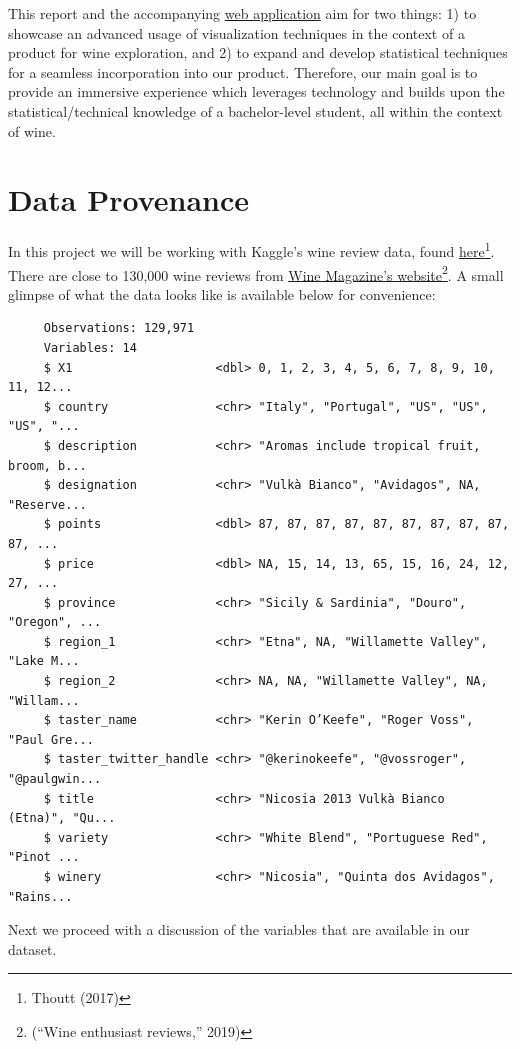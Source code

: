 \documentclass[12pt,twoside]{amherstthesis}
\begin{document}
This report and the accompanying
\href{https://szablah.shinyapps.io/wine/}{web application} aim for two
things: 1) to showcase an advanced usage of visualization techniques in
the context of a product for wine exploration, and 2) to expand and
develop statistical techniques for a seamless incorporation into our
product. Therefore, our main goal is to provide an immersive experience
which leverages technology and builds upon the statistical/technical
knowledge of a bachelor-level student, all within the context of wine.

\section{Data Provenance}\label{data-provenance}

In this project we will be working with Kaggle's wine review data, found
\href{https://www.kaggle.com/zynicide/wine-reviews}{here}\footnote{Thoutt
  (2017)}. There are close to 130,000 wine reviews from
\href{https://www.winemag.com/?s=\&drink_type=wine\&page=0}{Wine
Magazine's website}\footnote{(``Wine enthusiast reviews,'' 2019)}. A
small glimpse of what the data looks like is available below for
convenience:
\begin{verbatim}
     Observations: 129,971
     Variables: 14
     $ X1                    <dbl> 0, 1, 2, 3, 4, 5, 6, 7, 8, 9, 10, 11, 12...
     $ country               <chr> "Italy", "Portugal", "US", "US", "US", "...
     $ description           <chr> "Aromas include tropical fruit, broom, b...
     $ designation           <chr> "Vulkà Bianco", "Avidagos", NA, "Reserve...
     $ points                <dbl> 87, 87, 87, 87, 87, 87, 87, 87, 87, 87, ...
     $ price                 <dbl> NA, 15, 14, 13, 65, 15, 16, 24, 12, 27, ...
     $ province              <chr> "Sicily & Sardinia", "Douro", "Oregon", ...
     $ region_1              <chr> "Etna", NA, "Willamette Valley", "Lake M...
     $ region_2              <chr> NA, NA, "Willamette Valley", NA, "Willam...
     $ taster_name           <chr> "Kerin O’Keefe", "Roger Voss", "Paul Gre...
     $ taster_twitter_handle <chr> "@kerinokeefe", "@vossroger", "@paulgwin...
     $ title                 <chr> "Nicosia 2013 Vulkà Bianco  (Etna)", "Qu...
     $ variety               <chr> "White Blend", "Portuguese Red", "Pinot ...
     $ winery                <chr> "Nicosia", "Quinta dos Avidagos", "Rains...
\end{verbatim}
Next we proceed with a discussion of the variables that are available in
our dataset.
\end{document}
